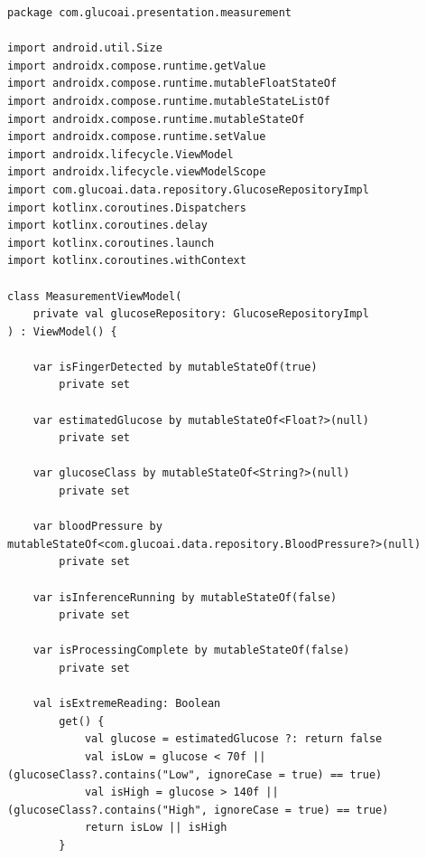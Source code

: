\vspace{1.5em}
\begin{center}
    \begin{minipage}{\textwidth}
        \centering
        \label{lst:kotlin_viewmodel}
        \vspace{-0.5em}
    \end{minipage}
\end{center}
\begin{verbatim}
package com.glucoai.presentation.measurement

import android.util.Size
import androidx.compose.runtime.getValue
import androidx.compose.runtime.mutableFloatStateOf
import androidx.compose.runtime.mutableStateListOf
import androidx.compose.runtime.mutableStateOf
import androidx.compose.runtime.setValue
import androidx.lifecycle.ViewModel
import androidx.lifecycle.viewModelScope
import com.glucoai.data.repository.GlucoseRepositoryImpl
import kotlinx.coroutines.Dispatchers
import kotlinx.coroutines.delay
import kotlinx.coroutines.launch
import kotlinx.coroutines.withContext

class MeasurementViewModel(
    private val glucoseRepository: GlucoseRepositoryImpl
) : ViewModel() {

    var isFingerDetected by mutableStateOf(true)
        private set

    var estimatedGlucose by mutableStateOf<Float?>(null)
        private set

    var glucoseClass by mutableStateOf<String?>(null)
        private set

    var bloodPressure by mutableStateOf<com.glucoai.data.repository.BloodPressure?>(null)
        private set

    var isInferenceRunning by mutableStateOf(false)
        private set

    var isProcessingComplete by mutableStateOf(false)
        private set

    val isExtremeReading: Boolean
        get() {
            val glucose = estimatedGlucose ?: return false
            val isLow = glucose < 70f || (glucoseClass?.contains("Low", ignoreCase = true) == true)
            val isHigh = glucose > 140f || (glucoseClass?.contains("High", ignoreCase = true) == true)
            return isLow || isHigh
        }


\end{verbatim}
